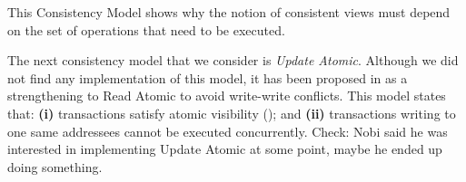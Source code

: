  

 
 
 

\ac{This Consistency Model shows why the notion of consistent views must 
depend on the set of operations that need to be executed.}

The next consistency model that we consider is \emph{Update Atomic}. 
Although we did not find any implementation of this model, it has been proposed in \cite{framework-concur} as a strengthening to Read Atomic to avoid write-write conflicts.
This model states that: \textbf{(i)} transactions satisfy atomic visibility (); and \textbf{(ii)} transactions writing to one same addressees cannot be executed concurrently.
\ac{Check: Nobi said he was interested in implementing Update Atomic 
at some point, maybe he ended up doing something.}

